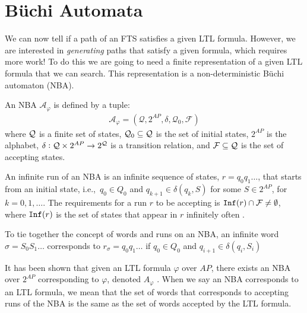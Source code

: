 \section{B\"{u}chi Automata}
We can now tell if a path of an FTS satisfies a given LTL formula. However, we are interested in \textit{generating} paths that satisfy a given formula, which requires more work! To do this we are going to need a finite representation of a given LTL formula that we can search. This representation is a non-deterministic B\"{u}chi automaton (NBA). 
\begin{definition}
\label{defNBA}
An NBA $\mathcal{A}_\varphi$ is defined by a tuple:
\begin{align*}
\mathcal{A}_\varphi = (\mathcal{Q},2^{AP},\delta,\mathcal{Q}_0,\mathcal{F})
\end{align*}
where $\mathcal{Q}$ is a finite set of states, $\mathcal{Q}_0 \subseteq \mathcal{Q}$ is the set of initial states, $2^{AP}$ is the alphabet, $\delta: \mathcal{Q} \times 2^{AP} \rightarrow 2^{\mathcal{Q}}$ is a transition relation, and $\mathcal{F} \subseteq \mathcal{Q}$ is the set of accepting states.
\end{definition} 
An infinite run of an NBA is an infinite sequence of states, $r=q_0 q_1 \dots$, that starts from an initial state, i.e.,\ $q_0 \in Q_0$ and $q_{k+1} \in \delta(q_k, S)$ for some $S \in 2^{AP}$, for $k = 0,1,\dots$. The requirements for a run $r$ to be accepting is $\texttt{Inf}(r) \cap \mathcal{F} \neq \emptyset$, where $\texttt{Inf}(r)$ is the set of states that appear in $r$ infinitely often \cite{guo15}. 

To tie together the concept of words and runs on an NBA, an infinite word $\sigma = S_0 S_1 \dots$ corresponds to $r_\sigma = q_0 q_1 \dots$ if $q_0 \in Q_0$ and $q_{i+1} \in \delta(q_i,S_i)$

It has been shown that given an LTL formula $\varphi$ over $AP$, there exists an NBA over $2^{AP}$ corresponding to $\varphi$, denoted $A_\varphi$ \cite{baier08}. When we say an NBA corresponds to an LTL formula, we mean that the set of words that corresponds to accepting runs of the NBA is the same as the set of words accepted by the LTL formula.  


